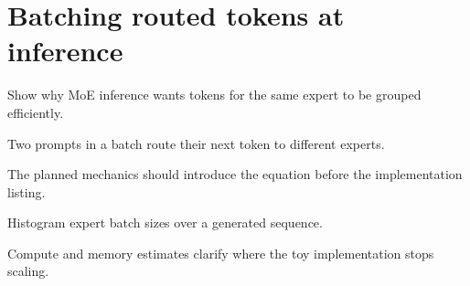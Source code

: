 \section{Batching routed tokens at inference}
\label{sec:ch12-batching-routed-tokens-at-inference}

Show why MoE inference wants tokens for the same expert to be grouped efficiently.



Two prompts in a batch route their next token to different experts.



The planned mechanics should introduce the equation before the implementation listing.





\begin{checkpointbox}
Histogram expert batch sizes over a generated sequence.
\end{checkpointbox}

Compute and memory estimates clarify where the toy implementation stops scaling.
